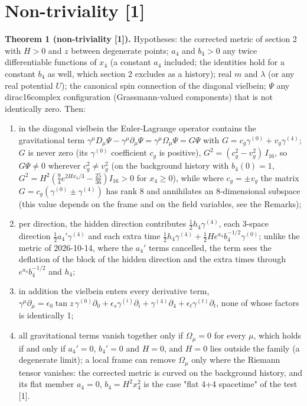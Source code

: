 \documentclass[11pt]{article}
\begin{document}
\section{Non-triviality [1]}

\textbf{Theorem 1 (non-triviality [1]).} Hypotheses: the corrected metric of section 2 with $H > 0$ and $z$ between degenerate points; $a_4$ and $b_4 > 0$ any twice differentiable functions of $x_4$ (a constant $a_4$ included; the identities hold for a constant $b_4$ as well, which section 2 excludes as a history); real $m$ and $\lambda$ (or any real potential $U$); the canonical spin connection of the diagonal vielbein; $\Psi$ any dirac16complex configuration (Grassmann-valued components) that is not identically zero. Then:

\begin{enumerate}
\item in the diagonal vielbein the Euler-Lagrange operator contains the gravitational term $\gamma^\mu D_\mu\Psi - \gamma^\mu\partial_\mu\Psi = \gamma^\mu\Omega_\mu\Psi = G\Psi$ with $G = c_g\gamma^{(0)} + v_g\gamma^{(4)}$; $G$ is never zero (its $\gamma^{(0)}$ coefficient $c_g$ is positive), $G^2 = (c_g^2 - v_g^2)\,I_{16}$, so $G\Psi \neq 0$ wherever $c_g^2 \neq v_g^2$ (on the background history with $b_4(0) = 1$, $G^2 = H^2(\tfrac94e^{2Hx_4/3} - \tfrac{25}{36})I_{16} > 0$ for $x_4 \geq 0$), while where $c_g = \pm v_g$ the matrix $G = c_g(\gamma^{(0)} \pm \gamma^{(4)})$ has rank 8 and annihilates an 8-dimensional subspace (this value depends on the frame and on the field variables, see the Remarks);
\item per direction, the hidden direction contributes $\tfrac12h_4\gamma^{(4)}$, each 3-space direction $\tfrac12a_4'\gamma^{(4)}$ and each extra time $\tfrac12h_4\gamma^{(4)} + \tfrac12He^{a_4}b_4^{-1/2}\gamma^{(0)}$; unlike the metric of 2026-10-14, where the $a_4'$ terms cancelled, the term sees the deflation of the block of the hidden direction and the extra times through $e^{a_4}b_4^{-1/2}$ and $h_4$;
\item in addition the vielbein enters every derivative term, $\gamma^\mu\partial_\mu = \epsilon_0\tan z\,\gamma^{(0)}\partial_0 + \epsilon_s\gamma^{(i)}\partial_i + \gamma^{(4)}\partial_4 + \epsilon_t\gamma^{(t)}\partial_t$, none of whose factors is identically 1;
\item all gravitational terms vanish together only if $\Omega_\mu = 0$ for every $\mu$, which holds if and only if $a_4' = 0$, $b_4' = 0$ and $H = 0$, and $H = 0$ lies outside the family (a degenerate limit); a local frame can remove $\Omega_\mu$ only where the Riemann tensor vanishes: the corrected metric is curved on the background history, and its flat member $a_4 = 0$, $b_4 = H^2x_4^2$ is the case "flat 4+4 spacetime" of the test [1].
\end{enumerate}
\end{document}
